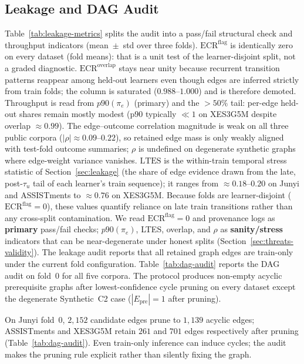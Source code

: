 \documentclass[preprint,10pt,doubleblind]{elsarticle}
\newcommand{\Epre}{\ensuremath{E_{\text{pre}}}}
\begin{document}
\subsection{Leakage and DAG Audit}
\label{sec:exp-audit}


Table~\ref{tab:leakage-metrics} splits the audit into a pass/fail structural
check and throughput indicators (mean~$\pm$~std over three folds).
$\mathrm{ECR}^{\mathrm{flag}}$ is identically zero on every dataset (fold means):
that is a unit test of the learner-disjoint split, not a graded diagnostic.
$\mathrm{ECR}^{\mathrm{overlap}}$ stays near unity because recurrent transition
patterns reappear among held-out learners even though edges are inferred
strictly from train folds; the column is saturated ($0.988$--$1.000$) and is
therefore demoted. Throughput is read from $p90(\pi_e)$ (primary) and the
$>50\%$ tail: per-edge held-out shares remain mostly modest (p90 typically
${\ll}1$ on XES3G5M despite overlap ${\approx}0.99$).
The edge--outcome correlation magnitude is weak on all three public corpora
($|\rho|{\approx}0.09$--$0.22$), so retained
edge mass is only weakly aligned with test-fold outcome summaries; $\rho$ is
undefined on degenerate synthetic graphs where edge-weight variance vanishes.
$\mathrm{LTES}$ is the within-train temporal stress statistic of
Section~\ref{sec:leakage} (the share of edge evidence drawn from the
late, post-$\tau_u$ tail of each learner's train sequence); it ranges from
${\approx}0.18$--$0.20$ on Junyi and ASSISTments to ${\approx}0.76$ on
XES3G5M. Because folds are learner-disjoint
($\mathrm{ECR}^{\mathrm{flag}}{=}0$), these values quantify reliance on
late train transitions rather than any cross-split contamination. We read
$\mathrm{ECR}^{\mathrm{flag}}{=}0$ and provenance logs as \textbf{primary}
pass/fail checks; $p90(\pi_e)$, LTES, overlap, and $\rho$ as
\textbf{sanity/stress} indicators that can be near-degenerate under honest
splits (Section~\ref{sec:threats-validity}).
The leakage audit reports that all retained graph edges are train-only
under the current fold configuration. Table~\ref{tab:dag-audit} reports
the DAG audit on fold~0 for all five corpora. The protocol produces
non-empty acyclic prerequisite graphs after lowest-confidence cycle
pruning on every dataset except the degenerate Synthetic~C2 case
($|\Epre|{=}1$ after pruning).

On Junyi fold~0, $2{,}152$ candidate edges prune to $1{,}139$ acyclic edges;
ASSISTments and XES3G5M retain $261$ and $701$ edges respectively after pruning
(Table~\ref{tab:dag-audit}). Even train-only inference can induce cycles; the
audit makes the pruning rule explicit rather than silently fixing the graph.
\end{document}
